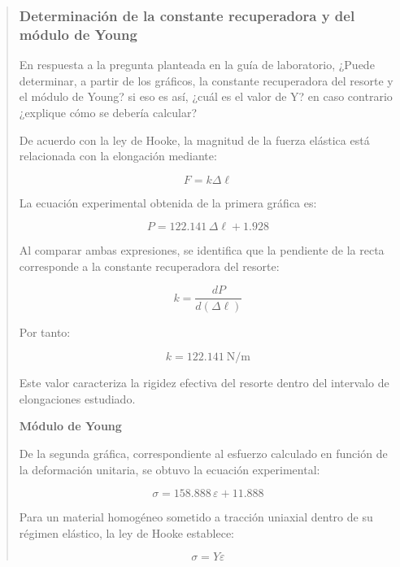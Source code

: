 \documentclass[11pt,a4paper]{article}
\begin{document}
\begin{quote}
\subsubsection{Determinación de la constante recuperadora
y del módulo de Young}

En respuesta a la pregunta planteada en la guía de
laboratorio, ¿Puede determinar, a partir de los gráficos, la constante recuperadora del resorte y el
módulo de Young? si eso es así, ¿cuál es el valor de Y? en caso contrario ¿explique cómo se
debería calcular?

De acuerdo con la ley de Hooke, la magnitud de la fuerza
elástica está relacionada con la elongación mediante:

\begin{equation}
    F = k\Delta\ell
\end{equation}

La ecuación experimental obtenida de la primera gráfica es:

\begin{equation}
    P = 122.141\,\Delta\ell + 1.928
\end{equation}

Al comparar ambas expresiones, se identifica que la
pendiente de la recta corresponde a la constante
recuperadora del resorte:

\begin{equation}
    k = \frac{dP}{d(\Delta\ell)}
\end{equation}

Por tanto:

\begin{equation}
    \boxed{k = 122.141\ \mathrm{N/m}}
\end{equation}

Este valor caracteriza la rigidez efectiva del resorte
dentro del intervalo de elongaciones estudiado.

\medskip

\noindent\textbf{Módulo de Young}

De la segunda gráfica, correspondiente al esfuerzo
calculado en función de la deformación unitaria,
se obtuvo la ecuación experimental:

\begin{equation}
    \sigma = 158.888\,\varepsilon + 11.888
\end{equation}

Para un material homogéneo sometido a tracción
uniaxial dentro de su régimen elástico, la ley
de Hooke establece:

\begin{equation}
    \sigma = Y\varepsilon
\end{equation}


\end{quote}
\end{document}
